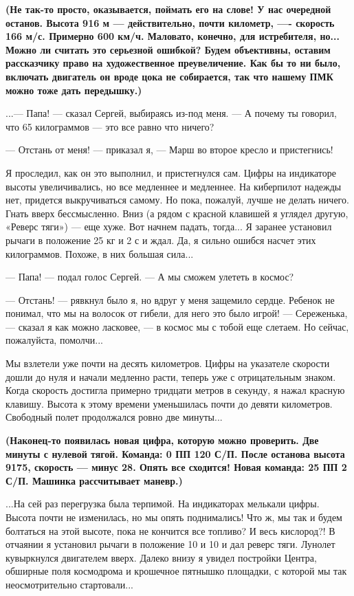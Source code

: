 \documentclass[11pt,a4paper,oneside]{article}
\begin{document}
\textbf{
(Не так-то просто, оказывается, поймать его на слове! У нас очередной останов. Высота 916 м — действительно, почти километр, —- скорость 166 м/с. Примерно 600 км/ч. Маловато, конечно, для истребителя, но... Можно ли считать это серьезной ошибкой? Будем объективны, оставим рассказчику право на художественное преувеличение. Как бы то ни было, включать двигатель он вроде цока не собирается, так что нашему ПМК можно тоже дать передышку.)}

...— Папа! — сказал Сергей, выбираясь из-под меня. — А почему ты говорил, что 65 килограммов — это все равно что ничего?

— Отстань от меня! — приказал я, — Марш во второе кресло и пристегнись!

Я проследил, как он это выполнил, и пристегнулся сам. Цифры на индикаторе высоты увеличивались, но все медленнее и медленнее. На киберпилот надежды нет, придется выкручиваться самому. Но пока, пожалуй, лучше не делать ничего. Гнать вверх бессмысленно. Вниз (а рядом с красной клавишей я углядел другую, «Реверс тяги») — еще хуже. Вот начнем падать, тогда... Я заранее установил рычаги в положение 25 кг и 2 с и ждал. Да, я сильно ошибся насчет этих килограммов. Похоже, в них большая сила...

— Папа! — подал голос Сергей. — А мы сможем улететь в космос?

— Отстань! — рявкнул было я, но вдруг у меня защемило сердце. Ребенок не понимал, что мы на волосок от гибели, для него это было игрой! — Сереженька, — сказал я как можно ласковее, — в космос мы с тобой еще слетаем. Но сейчас, пожалуйста, помолчи...

Мы взлетели уже почти на десять километров. Цифры на указателе скорости дошли до нуля и начали медленно расти, теперь уже с отрицательным знаком. Когда скорость достигла примерно тридцати метров в секунду, я нажал красную клавишу. Высота к этому времени уменьшилась почти до девяти километров. Свободный полет продолжался ровно две минуты...

\textbf{
(Наконец-то появилась новая цифра, которую можно проверить. Две минуты с нулевой тягой. Команда: 0 ПП 120 С/П. После останова высота 9175, скорость — минус 28. Опять все сходится! Новая команда: 25 ПП 2 С/П. Машинка рассчитывает маневр.)}

...На сей раз перегрузка была терпимой. На индикаторах мелькали цифры. Высота почти не изменилась, но мы опять поднимались! Что ж, мы так и будем болтаться на этой высоте, пока не кончится все топливо? И весь кислород?! В отчаянии я установил рычаги в положение 10 и 10 и дал реверс тяги. Лунолет кувыркнулся двигателем вверх. Далеко внизу я увидел постройки Центра, обширные поля космодрома и крошечное пятнышко площадки, с которой мы так неосмотрительно стартовали...
\end{document}
